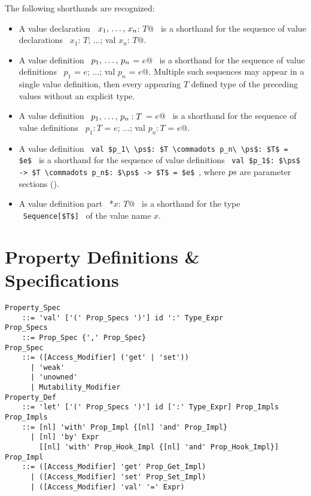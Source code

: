 The following shorthands are recognized: 
\begin{itemize}
  \item[] A value declaration ~\lstinline@let $x_1 ,\, \ldots ,\, x_n$: $T$@~ is a shorthand for the sequence of value declarations ~\lstinline@val $x_1$: $T$; $\ldots$; val $x_n$: $T$@. 

  \item[] A value definition ~\lstinline@val $p_1 ,\, \ldots ,\, p_n$ = $e$@~ is a shorthand for the sequence of value definitions ~\lstinline@val $p_1$ = $e$; $\ldots$; val $p_n$ = $e$@. Multiple such sequences may appear in a single value definition, then every appearing $T$ defined type of the preceding values without an explicit type. 

  \item[] A value definition ~\lstinline@val $p_1 ,\, \ldots ,\, p_n: T$ = $e$@~ is a shorthand for the sequence of value definitions ~\lstinline@val $p_1: T$ = $e$; $\ldots$; val $p_n: T$ = $e$@.

  \item[] A value definition ~\lstinline!val $p_1\ \ps$: $T \commadots p_n\ \ps$: $T$ = $e$!~ is a shorthand for the sequence of value definitions ~\lstinline!val $p_1$: $\ps$ -> $T \commadots p_n$: $\ps$ -> $T$ = $e$!~, where $\mbox{\sl ps}$ are parameter sections ().

  \item[] A value definition part ~\lstinline@*$x$: $T$@~ is a shorthand for the type ~\lstinline!Sequence[$T$]!~ of the value name $x$. 
\end{itemize}






\section{Property Definitions \& Specifications}
\label{sec:property-def}

\grammar\begin{lstlisting}[deletekeywords={of,up,to}]
Property_Spec
    ::= 'val' ['(' Prop_Specs ')'] id ':' Type_Expr
Prop_Specs 
    ::= Prop_Spec {',' Prop_Spec}
Prop_Spec 
    ::= ([Access_Modifier] ('get' | 'set')) 
      | 'weak'
      | 'unowned'
      | Mutability_Modifier
Property_Def
    ::= 'let' ['(' Prop_Specs ')'] id [':' Type_Expr] Prop_Impls
Prop_Impls 
    ::= [nl] 'with' Prop_Impl {[nl] 'and' Prop_Impl}
      | [nl] 'by' Expr 
        [[nl] 'with' Prop_Hook_Impl {[nl] 'and' Prop_Hook_Impl}]
Prop_Impl 
    ::= ([Access_Modifier] 'get' Prop_Get_Impl)
      | ([Access_Modifier] 'set' Prop_Set_Impl)
      | ([Access_Modifier] 'val' '=' Expr)
\end{lstlisting}

